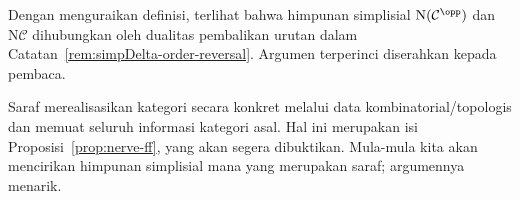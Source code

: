 \begin{remark}
	Dengan menguraikan definisi, terlihat bahwa himpunan simplisial
	$\mathrm{N}(\mathcal{C}^{\opp})$ dan $\mathrm{N}\mathcal{C}$ dihubungkan
	oleh dualitas pembalikan urutan dalam
	Catatan~\ref{rem:simpDelta-order-reversal}. Argumen terperinci diserahkan
	kepada pembaca.
\end{remark}

Saraf merealisasikan kategori secara konkret melalui data kombinatorial/topologis
dan memuat seluruh informasi kategori asal. Hal ini merupakan isi
Proposisi~\ref{prop:nerve-ff}, yang akan segera dibuktikan. Mula-mula kita
akan mencirikan himpunan simplisial mana yang merupakan saraf; argumennya menarik.

